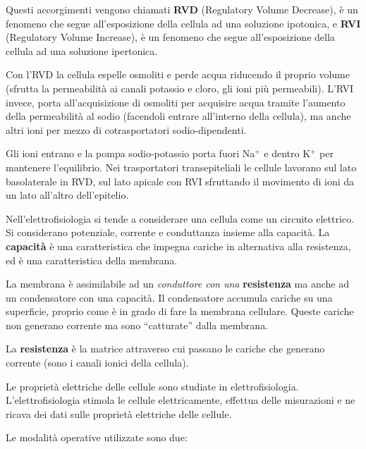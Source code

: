 \documentclass[]{article}
\begin{document}
Questi accorgimenti vengono chiamati \textbf{RVD} (Regulatory Volume
Decrease), è un fenomeno che segue all'esposizione della cellula ad una
soluzione ipotonica, e \textbf{RVI} (Regulatory Volume Increase), è un
fenomeno che segue all'esposizione della cellula ad una soluzione
ipertonica.

Con l'RVD la cellula espelle osmoliti e perde acqua riducendo il proprio
volume (sfrutta la permeabilità ai canali potassio e cloro, gli ioni più
permeabili). L'RVI invece, porta all'acquisizione di osmoliti per
acquisire acqua tramite l'aumento della permeabilità al sodio (facendoli
entrare all'interno della cellula), ma anche altri ioni per mezzo di
cotrasportatori sodio-dipendenti.

Gli ioni entrano e la pompa sodio-potassio porta fuori Na\(^+\) e dentro
K\(^+\) per mantenere l'equilibrio. Nei trasportatori transepiteliali le
cellule lavorano sul lato basolaterale in RVD, sul lato apicale con RVI
sfruttando il movimento di ioni da un lato all'altro dell'epitelio.

Nell'elettrofisiologia si tende a considerare una cellula come un
circuito elettrico. Si considerano potenziale, corrente e conduttanza
insieme alla capacità. La \textbf{capacità} è una caratteristica che
impegna cariche in alternativa alla resistenza, ed è una caratteristica
della membrana.

La membrana è assimilabile ad un \emph{conduttore con una}
\textbf{resistenza} ma anche ad un condensatore con una capacità. Il
condensatore accumula cariche su una superficie, proprio come è in grado
di fare la membrana cellulare. Queste cariche non generano corrente ma
sono ``catturate'' dalla membrana.

La \textbf{resistenza} è la matrice attraverso cui passano le cariche
che generano corrente (sono i canali ionici della cellula).

Le proprietà elettriche delle cellule sono studiate in
elettrofisiologia. L'elettrofisiologia stimola le cellule
elettricamente, effettua delle misurazioni e ne ricava dei dati sulle
proprietà elettriche delle cellule.

Le modalità operative utilizzate sono due:
\end{document}
